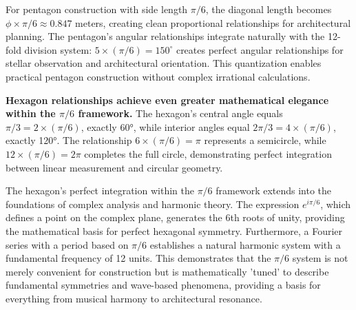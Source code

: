 \documentclass[11pt]{article}
\begin{document}
For pentagon construction with side length $\pi/6$, the diagonal length becomes $\phi \times \pi/6 \approx 0.847$ meters, creating clean proportional relationships for architectural planning. The pentagon's angular relationships integrate naturally with the 12-fold division system: $5 \times (\pi/6) = 150^\circ$ creates perfect angular relationships for stellar observation and architectural orientation. This quantization enables practical pentagon construction without complex irrational calculations.

\textbf{Hexagon relationships achieve even greater mathematical elegance within the $\pi/6$ framework.} The hexagon's central angle equals $\pi/3 = 2 \times (\pi/6)$, exactly 60°, while interior angles equal $2\pi/3 = 4 \times (\pi/6)$, exactly 120°. The relationship $6 \times (\pi/6) = \pi$ represents a semicircle, while $12 \times (\pi/6) = 2\pi$ completes the full circle, demonstrating perfect integration between linear measurement and circular geometry.

The hexagon's perfect integration within the $\pi/6$ framework extends into the foundations of complex analysis and harmonic theory. The expression $e^{i\pi/6}$, which defines a point on the complex plane, generates the 6th roots of unity, providing the mathematical basis for perfect hexagonal symmetry. Furthermore, a Fourier series with a period based on $\pi/6$ establishes a natural harmonic system with a fundamental frequency of 12 units. This demonstrates that the $\pi/6$ system is not merely convenient for construction but is mathematically 'tuned' to describe fundamental symmetries and wave-based phenomena, providing a basis for everything from musical harmony to architectural resonance.
\end{document}
